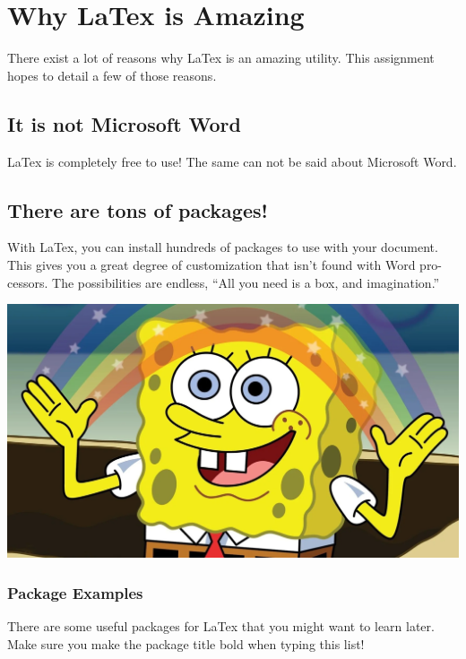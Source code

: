 \section{Why LaTex is Amazing}
There exist a lot of reasons why LaTex is an amazing utility. This assignment hopes to detail a few of those reasons.

\subsection{It is not Microsoft Word}
LaTex is completely free to use! The same can not be said about Microsoft Word.

\subsection{There are tons of packages!}
With LaTex, you can install hundreds of packages to use with your document. This gives you a great degree of customization that isn't found with Word pro-cessors. The possibilities are endless, ``All you need is a box, and imagination.''
\begin{center}
\includegraphics[scale=0.17]{imagination}
\end{center}

\subsubsection{Package Examples}
There are some useful packages for LaTex that you might want to learn later. Make sure you make the package title bold when typing this list!
